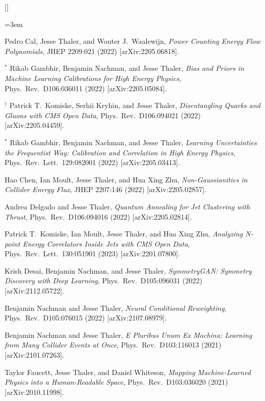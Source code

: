 \begin{list}{[]\addtocounter{jessecount}{-1}}{\leftmargin=3em \itemsep=4pt}
\item
 Pedro Cal, Jesse Thaler, and Wouter J.\ Waalewijn,
\emph{Power Counting Energy Flow Polynomials},
JHEP 2209:021 (2022)
[arXiv:2205.06818].

\item
${}^\ast$ Rikab Gambhir, Benjamin Nachman, and Jesse Thaler,
\emph{Bias and Priors in Machine Learning Calibrations for High Energy Physics},
Phys.\ Rev.\ D106:036011 (2022)
[arXiv:2205.05084].

\item
${}^\dagger$ Patrick T.\ Komiske, Serhii Kryhin, and Jesse Thaler,
\emph{Disentangling Quarks and Gluons with CMS Open Data},
Phys.\ Rev.\ D106:094021 (2022)
[arXiv:2205.04459].

\item
${}^\ast$ Rikab Gambhir, Benjamin Nachman, and Jesse Thaler,
\emph{Learning Uncertainties the Frequentist Way: Calibration and Correlation in High Energy Physics},
Phys.\ Rev.\ Lett.\ 129:082001 (2022)
[arXiv:2205.03413].

\item
 Hao Chen, Ian Moult, Jesse Thaler, and Hua Xing Zhu,
\emph{Non-Gaussianities in Collider Energy Flux},
JHEP 2207:146 (2022)
[arXiv:2205.02857].

\item
 Andrea Delgado and Jesse Thaler,
\emph{Quantum Annealing for Jet Clustering with Thrust},
Phys.\ Rev.\ D106:094016 (2022)
[arXiv:2205.02814].

\item
 Patrick T.\ Komiske, Ian Moult, Jesse Thaler, and Hua Xing Zhu,
\emph{Analyzing N-point Energy Correlators Inside Jets with CMS Open Data},
Phys.\ Rev.\ Lett.\ 130:051901 (2023)
[arXiv:2201.07800].

\item
 Krish Desai, Benjamin Nachman, and Jesse Thaler,
\emph{SymmetryGAN: Symmetry Discovery with Deep Learning},
Phys.\ Rev.\ D105:096031 (2022)
[arXiv:2112.05722].

\item
 Benjamin Nachman and Jesse Thaler,
\emph{Neural Conditional Reweighting},
Phys.\ Rev.\ D105:076015 (2022)
[arXiv:2107.08979].

\item
 Benjamin Nachman and Jesse Thaler,
\emph{E Pluribus Unum Ex Machina: Learning from Many Collider Events at Once},
Phys.\ Rev.\ D103:116013 (2021)
[arXiv:2101.07263].

\item
 Taylor Faucett, Jesse Thaler, and Daniel Whiteson,
\emph{Mapping Machine-Learned Physics into a Human-Readable Space},
Phys.\ Rev.\ D103:036020 (2021)
[arXiv:2010.11998].


\end{list}
